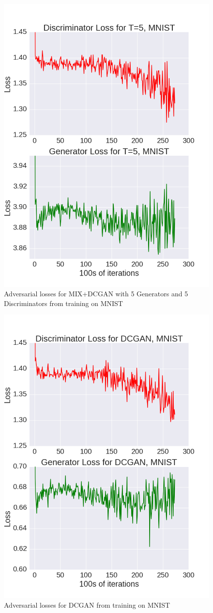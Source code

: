 \documentclass{article}
\begin{document}
\begin{figure}[!htb]%
  \centering
  \includegraphics[width=.85\linewidth]{figures/Loss_Graph_MNIST_T=5.png}
  \caption[Figure 5]{Adversarial losses for MIX+DCGAN with 5 Generators and 5 Discriminators from training on MNIST}
  \label{fig5}
\end{figure}

\begin{figure}[!htb]%
  \centering
  \includegraphics[width=.85\linewidth]{figures/Loss_Graph_MNIST_T=1.png}
  \caption[Figure 6]{Adversarial losses for DCGAN from training on MNIST}
  \label{fig6}
\end{figure}
\end{document}
